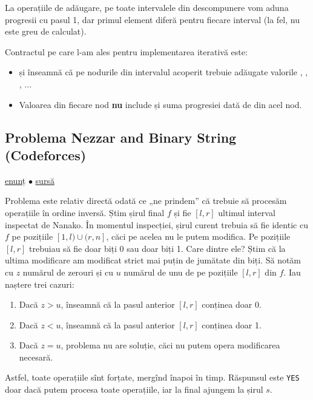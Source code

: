 \documentclass[../main.tex]{subfiles}
\begin{document}
La operațiile de adăugare, pe toate intervalele din descompunere vom aduna progresii cu pasul 1, dar primul element diferă pentru fiecare interval (la fel, nu este greu de calculat).

Contractul pe care l-am ales pentru implementarea iterativă este:

\begin{itemize}
  \item {} și  înseamnă că pe nodurile din intervalul acoperit trebuie adăugate valorile , , , ...
  \item Valoarea  din fiecare nod \textbf{nu} include și suma progresiei dată de  din acel nod.
\end{itemize}

\subsection{Problema Nezzar and Binary String (Codeforces)}
\label{problem:nezzar-and-binary-string}

\href{https://codeforces.com/contest/1478/problem/E}{enunț}
$\bullet$
\hyperref[code:nezzar-and-binary-string]{sursă}

Problema este relativ directă odată ce „ne prindem” că trebuie să procesăm operațiile în ordine inversă. Știm șirul final $f$ și fie $[l, r]$ ultimul interval inspectat de Nanako. În momentul inspecției, șirul curent trebuia să fie identic cu $f$ pe pozițiile $[1, l) \cup (r,n]$, căci pe acelea nu le putem modifica. Pe pozițiile $[l, r]$ trebuiau să fie doar biți 0 sau doar biți 1. Care dintre ele? Știm că la ultima modificare am modificat strict mai puțin de jumătate din biți. Să notăm cu $z$ numărul de zerouri și cu $u$ numărul de unu de pe pozițiile $[l,r]$ din $f$. Iau naștere trei cazuri:

\begin{enumerate}
  \item Dacă $z > u$, înseamnă că la pasul anterior $[l,r]$ conținea doar 0.
  \item Dacă $z < u$, înseamnă că la pasul anterior $[l,r]$ conținea doar 1.
  \item Dacă $z = u$, problema nu are soluție, căci nu putem opera modificarea necesară.
\end{enumerate}

Astfel, toate operațiile sînt forțate, mergînd înapoi în timp. Răspunsul este \texttt{YES} doar dacă putem procesa toate operațiile, iar la final ajungem la șirul $s$.
\end{document}
